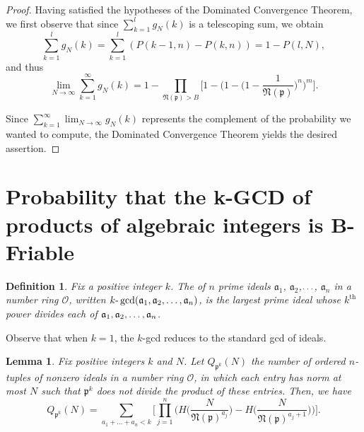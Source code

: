 \documentclass[12pt]{amsart}
\newtheorem{lemma}[theorem]{Lemma}
\newtheorem{definition}[theorem]{Definition}
\theoremstyle{definition}
\newcommand{\f}[1]{\mathfrak{#1}}
\begin{document}
\begin{proof}
	Having satisfied the hypotheses of the Dominated Convergence Theorem, we first observe that since $\sum_{k=1}^l g_N(k)$ is a telescoping sum, we obtain
	$$\sum_{k=1}^l g_N(k) = \sum_{k=1}^l (P(k-1, n) - P(k, n)) = 1 - P(l,N),$$ 
	and thus
	$$\lim_{N \to \infty} \sum_{k=1}^{\infty} g_N(k) = 1 - \prod_{\mathfrak{N}(\mathfrak{p}) > B} \Big[1 - \Big(1 - \Big(1 - \frac{1}{\mathfrak{N}(\mathfrak{p})}  \Big)^n\Big)^m\Big].$$
	
	\noindent Since $\displaystyle \sum_{k=1}^{\infty} \lim_{N \to \infty} g_N(k)$ represents the complement of the probability we wanted to compute, the Dominated Convergence Theorem yields the desired assertion.
\end{proof}


\section{Probability that the k-GCD of products of algebraic integers is B-Friable}

\begin{definition} Fix a positive integer $k$. The  of $n$ prime ideals $\f{a}_1$, $\f{a}_2$,$\mathellipsis$, $\f{a}_n$ in a number ring $\mathcal{O}$, written $k\text{-}\gcd(\f{a}_1,\f{a}_2, \mathellipsis,\f{a}_n)$, is the largest prime ideal whose $k^{\text{th}}$ power divides each of $\f{a}_1, \f{a}_2,\mathellipsis, \f{a}_n$.
\end{definition}	

\noindent Observe that when $k=1$, the $k$-gcd reduces to the standard gcd of ideals.

\begin{lemma}
	Fix positive integers $k$ and $N$. Let $Q_{\f{p}^k}(N)$ the number of ordered $n$-tuples of nonzero ideals in a number ring $\mathcal{O}$, in which each entry has norm at most $N$ such that $\f{p}^k$ does not divide the product of these entries. Then, we have
	$$Q_{\f{p}^k}(N) = \sum_{a_1+...+a_n < k} \Big[\prod_{j=1}^n \Big(H\bigg( \frac{N}{\f{N}(\f{p})^{a_j}}\bigg) - H\bigg(\frac{N}{\f{N}(\f{p})^{a_j + 1}}\bigg)\Big)\Big].$$
\end{lemma}
\end{document}
